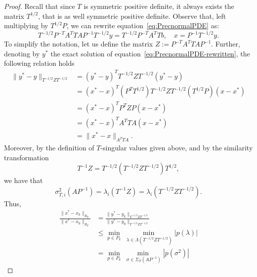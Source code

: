 \documentclass[hidelinks,onefignum,onetabnum]{siamart220329}
\newcommand{\bb}[1]{#1}
\begin{document}
\begin{proof}
    Recall that since $T$ is symmetric positive definite, it always exists the matrix $T^{1/2}$, that is as well symmetric positive definite. Observe that, \bb{left multiplying by}  $T^{1/2}P$, we can rewrite equation~\eqref{eq:PrecnormalPDE} as:
    \begin{equation}
        \label{eq:PrecnormalPDE-rewritten}
        T^{-1/2}P^{-T}A^T T A P^{-1} T^{-1/2} y = T^{-1/2}P^{-T}A^T Tb, \quad x=P^{-1}T^{-1/2}y.
    \end{equation}
    To simplify the notation, let us define the matrix $Z := P^{-T}A^T T A P^{-1}$.
    Further, denoting by $y^*$ the exact solution of equation~\eqref{eq:PrecnormalPDE-rewritten}, the following relation holds
    \begin{equation}
        \begin{aligned}
            \|y^*- y\|_{T^{-1/2}Z T^{-1/2}} & = (y^*-y)^TT^{-1/2}Z T^{-1/2}(y^*-y)                         \\
                                            & = (x^*-x)^T(P^T T^{1/2}) T^{-1/2}Z T^{-1/2}(T^{1/2}P)(x-x^*) \\
                                            & = (x^*-x)^T P^T Z P(x-x^*)                                   \\
                                            & = (x^*-x)^T A^TTA(x-x^*)                                     \\
                                            & = \|x^*-x\|_{A^TTA}.
        \end{aligned}
    \end{equation}
    Moreover, by the definition of $T$-singular values given above, and by the similarity transformation
    \begin{equation}
        T^{-1}Z = T^{-1/2}(T^{-1/2}ZT^{-1/2})T^{1/2},
    \end{equation}
    we have that
    \begin{equation}
        \label{eq:singVsEige}
        \sigma^2_{T,i}\left(AP^{-1}\right) = \lambda_i\left(T^{-1}Z\right) = \lambda_i \left( T^{-1/2}ZT^{-1/2} \right).
    \end{equation}
    Thus,
    \begin{equation}
        \begin{aligned}
            \frac{\|x^* - x_k \|_{B_T}}{\|x^* - x_0 \|_{B_T}} & = \frac{\|y^* - y_k\|_{T^{-1/2}ZT^{-1/2}}}{\|y^* - y_0\|_{T^{-1/2}ZT^{-1/2}}}                                     \\
                                                              & \leq \underset{p\in P_k}{\bb{\min}} \underset{\,\,\lambda \in \Lambda(T^{-1/2}ZT^{-1/2})}{\bb{\min}} |p(\lambda)| \\
                                                              & = \underset{p\in P_k}{\bb{\min}} \underset{\,\,\sigma \in \Sigma_T(AP^{-1})}{\bb{\min}} |p(\sigma^2)|
        \end{aligned}
    \end{equation}


\end{proof}
\end{document}
